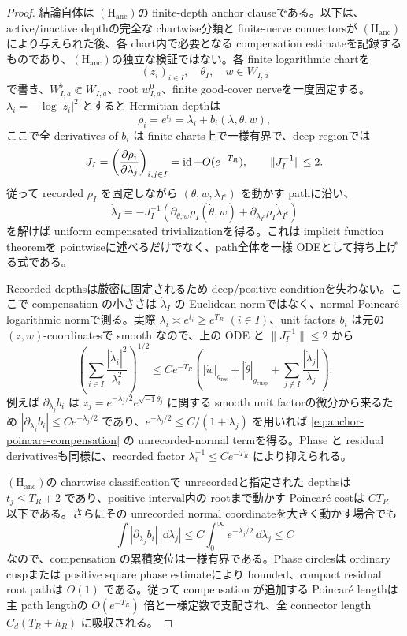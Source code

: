 \documentclass[11pt,a4paper]{ltjsarticle}
\newcommand{\Hanc}{\ensuremath{(\mathrm H_{\mathrm{anc}})}}
\theoremstyle{plain}
\theoremstyle{definition}
\theoremstyle{remark}
\begin{document}
\begin{proof}
結論自体は \Hanc の finite-depth anchor clauseである。以下は、active/inactive depthの完全な chartwise分類と finite-nerve connectorsが \Hanc により与えられた後、各 chart内で必要となる compensation estimateを記録するものであり、\Hanc の独立な検証ではない。各 finite logarithmic chartを
\[
 (z_i)_{i\in I},\quad \theta_I,\quad w\in W_{I,a}
\]
で書き、$W_{I,a}^{\flat}\Subset W_{I,a}$、root $w_{I,a}^0$、finite good-cover nerveを一度固定する。$\lambda_i=-\log|z_i|^2$ とすると Hermitian depthは
\[
 \rho_i=e^{t_i}=\lambda_i+b_i(\lambda,\theta,w),
\]
ここで全 derivatives of $b_i$ は finite charts上で一様有界で、deep regionでは
\[
 J_I=\left(\frac{\partial\rho_i}{\partial\lambda_j}\right)_{i,j\in I}
 =\operatorname{id}+O(e^{-T_R}),
 \qquad \|J_I^{-1}\|\le2.
\]
従って recorded $\rho_I$ を固定しながら $(\theta,w,\lambda_{I^c})$ を動かす pathに沿い、
\[
 \dot\lambda_I
 =-J_I^{-1}\left(
   \partial_{\theta,w}\rho_I(\dot\theta,\dot w)
   +\partial_{\lambda_{I^c}}\rho_I\dot\lambda_{I^c}
 \right)
\]
を解けば uniform compensated trivializationを得る。これは implicit function theoremを pointwiseに述べるだけでなく、path全体を一様 ODEとして持ち上げる式である。

Recorded depthsは厳密に固定されるため deep/positive conditionを失わない。ここで compensation の小ささは $\dot\lambda_I$ の Euclidean normではなく、normal Poincar\'e logarithmic normで測る。実際 $\lambda_i\asymp e^{t_i}\ge e^{T_R}$ $(i\in I)$、unit factors $b_i$ は元の $(z,w)$-coordinatesで smooth なので、上の ODE と $\|J_I^{-1}\|\le2$ から
\begin{equation}\label{eq:anchor-poincare-compensation}
 \left(\sum_{i\in I}\frac{|\dot\lambda_i|^2}{\lambda_i^2}\right)^{1/2}
 \le C e^{-T_R}\left(
   |\dot w|_{g_{\mathrm{res}}}
   +|\dot\theta|_{g_{\mathrm{cusp}}}
   +\sum_{j\notin I}\frac{|\dot\lambda_j|}{\lambda_j}
 \right).
\end{equation}
例えば $\partial_{\lambda_j}b_i$ は $z_j=e^{-\lambda_j/2}e^{\sqrt{-1}\theta_j}$ に関する smooth unit factorの微分から来るため $|\partial_{\lambda_j}b_i|\le Ce^{-\lambda_j/2}$ であり、$e^{-\lambda_j/2}\le C/(1+\lambda_j)$ を用いれば \eqref{eq:anchor-poincare-compensation} の unrecorded-normal termを得る。Phase と residual derivativesも同様に、recorded factor $\lambda_i^{-1}\le Ce^{-T_R}$ により抑えられる。

\Hanc の chartwise classificationで unrecordedと指定された depthsは $t_j\le T_R+2$ であり、positive interval内の rootまで動かす Poincar\'e costは $CT_R$ 以下である。さらにその unrecorded normal coordinateを大きく動かす場合でも
\[
 \int |\partial_{\lambda_j}b_i|\,|\dd\lambda_j|
 \le C\int_0^\infty e^{-\lambda_j/2}\,\dd\lambda_j\le C
\]
なので、compensation の累積変位は一様有界である。Phase circlesは ordinary cuspまたは positive square phase estimateにより bounded、compact residual root pathは $O(1)$ である。従って compensation が追加する Poincar\'e lengthは主 path lengthの $O(e^{-T_R})$ 倍と一様定数で支配され、全 connector length $C_d(T_R+h_R)$ に吸収される。


\end{proof}
\end{document}
